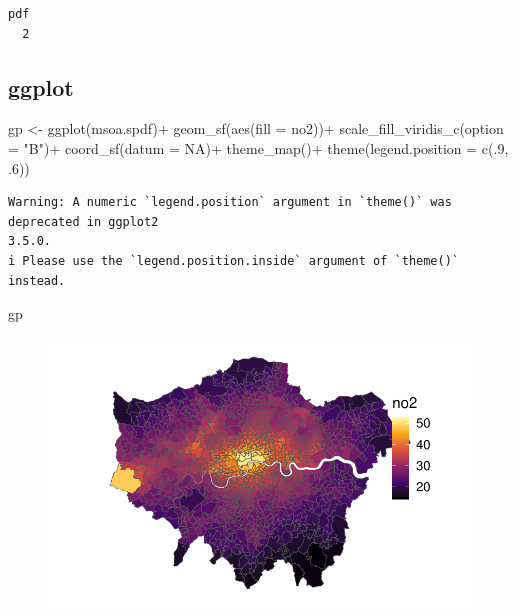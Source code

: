 \documentclass[
  letterpaper,
  DIV=11,
  numbers=noendperiod]{scrreprt}
\newenvironment{Shaded}{\begin{snugshade}}{\end{snugshade}}
\newcommand{\AttributeTok}[1]{\textcolor[rgb]{0.40,0.45,0.13}{#1}}
\newcommand{\ConstantTok}[1]{\textcolor[rgb]{0.56,0.35,0.01}{#1}}
\newcommand{\DecValTok}[1]{\textcolor[rgb]{0.68,0.00,0.00}{#1}}
\newcommand{\FunctionTok}[1]{\textcolor[rgb]{0.28,0.35,0.67}{#1}}
\newcommand{\NormalTok}[1]{\textcolor[rgb]{0.00,0.23,0.31}{#1}}
\newcommand{\OtherTok}[1]{\textcolor[rgb]{0.00,0.23,0.31}{#1}}
\newcommand{\SpecialCharTok}[1]{\textcolor[rgb]{0.37,0.37,0.37}{#1}}
\newcommand{\StringTok}[1]{\textcolor[rgb]{0.13,0.47,0.30}{#1}}
\begin{document}
\begin{verbatim}
pdf 
  2 
\end{verbatim}

\hypertarget{ggplot}{%
\subsection{ggplot}\label{ggplot}}

\begin{Shaded}
\begin{Highlighting}[]
\NormalTok{gp }\OtherTok{\textless{}{-}} \FunctionTok{ggplot}\NormalTok{(msoa.spdf)}\SpecialCharTok{+}
    \FunctionTok{geom\_sf}\NormalTok{(}\FunctionTok{aes}\NormalTok{(}\AttributeTok{fill =}\NormalTok{ no2))}\SpecialCharTok{+}
    \FunctionTok{scale\_fill\_viridis\_c}\NormalTok{(}\AttributeTok{option =} \StringTok{"B"}\NormalTok{)}\SpecialCharTok{+}
    \FunctionTok{coord\_sf}\NormalTok{(}\AttributeTok{datum =} \ConstantTok{NA}\NormalTok{)}\SpecialCharTok{+}
    \FunctionTok{theme\_map}\NormalTok{()}\SpecialCharTok{+}
    \FunctionTok{theme}\NormalTok{(}\AttributeTok{legend.position =} \FunctionTok{c}\NormalTok{(.}\DecValTok{9}\NormalTok{, .}\DecValTok{6}\NormalTok{))}
\end{Highlighting}
\end{Shaded}

\begin{verbatim}
Warning: A numeric `legend.position` argument in `theme()` was deprecated in ggplot2
3.5.0.
i Please use the `legend.position.inside` argument of `theme()` instead.
\end{verbatim}

\begin{Shaded}
\begin{Highlighting}[]
\NormalTok{gp}
\end{Highlighting}
\end{Shaded}

\begin{figure}[H]

{\centering \includegraphics{02_spatial-data_files/figure-pdf/unnamed-chunk-22-1.pdf}

}

\end{figure}
\end{document}
